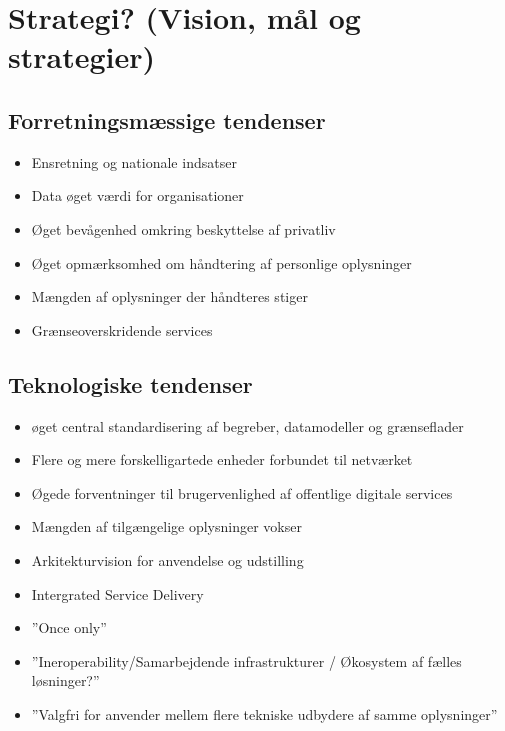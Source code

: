 \section{Strategi? (Vision, mål og
strategier)}\label{strategi-vision-muxe5l-og-strategier}

\subsection{Forretningsmæssige
tendenser}\label{forretningsmuxe6ssige-tendenser}

\begin{itemize}
\tightlist
\item
  Ensretning og nationale indsatser
\item
  Data øget værdi for organisationer
\item
  Øget bevågenhed omkring beskyttelse af privatliv
\item
  Øget opmærksomhed om håndtering af personlige oplysninger
\item
  Mængden af oplysninger der håndteres stiger
\item
  Grænseoverskridende services
\end{itemize}

\subsection{Teknologiske tendenser}\label{teknologiske-tendenser}

\begin{itemize}
\tightlist
\item
  øget central standardisering af begreber, datamodeller og grænseflader
\item
  Flere og mere forskelligartede enheder forbundet til netværket
\item
  Øgede forventninger til brugervenlighed af offentlige digitale
  services
\item
  Mængden af tilgængelige oplysninger vokser
\item
  Arkitekturvision for anvendelse og udstilling
\item
  Intergrated Service Delivery
\item
  ''Once only''
\item
  ''Ineroperability/Samarbejdende infrastrukturer / Økosystem af fælles
  løsninger?''
\item
  ''Valgfri for anvender mellem flere tekniske udbydere af samme
  oplysninger''
\end{itemize}

